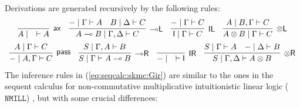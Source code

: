 \documentclass[sn-mathphys-num]{sn-jnl}%
\newcommand{\tl}{\otimes \mathsf{L}}
\newcommand{\tr}{\otimes\mathsf{R}}
\newcommand{\pass}{\mathsf{pass}}
\newcommand{\unitl}{\mathsf{IL}}
\newcommand{\unitr}{\mathsf{IR}}
\newcommand{\ax}{\mathsf{ax}}
\newcommand{\ot}{\otimes}
\newcommand{\lolli}{\multimap}
\newcommand{\lleft}{{\lolli}\mathsf{L}}
\newcommand{\lright}{{\lolli}\mathsf{R}}
\newcommand{\I}{\mathsf{I}}
\newcommand{\vdG}{\vdash}
\newcommand{\NMILL}{$\mathtt{NMILL}$}
\theoremstyle{thmstyleone}%
\theoremstyle{thmstyletwo}%
\theoremstyle{thmstylethree}%
\begin{document}
Derivations are generated recursively by the following rules:
\begin{equation}\label{eq:seqcalc:skmc:Gir}
	  \begin{array}{c}
		\infer[\ax]{A \mid \quad \vdG A}{}
		\quad
		\infer[\lleft]{A \lolli B \mid \Gamma , \Delta \vdG C}{
		  {-} \mid \Gamma \vdG A
		  &
		  B \mid \Delta \vdG C
		}
		\quad
		\infer[\unitl]{\I \mid \Gamma \vdG C}{{-} \mid \Gamma \vdG C}
		\quad
		\infer[\tl]{A \ot B \mid \Gamma \vdG C}{A \mid B , \Gamma \vdG C}
		\\[5pt]
    \infer[\pass]{{-} \mid A , \Gamma \vdG C}{A \mid \Gamma \vdG C}
		\quad
		\infer[\lright]{S \mid \Gamma \vdG A \lolli B}{S \mid \Gamma , A \vdG B}
		\quad
		\infer[\unitr]{{-} \mid \quad \vdG \I}{}
		\quad
		\infer[\tr]{S \mid \Gamma , \Delta \vdG A \ot B}{
		  S \mid \Gamma \vdG A
		  &
		  {-} \mid \Delta \vdG B
		}
	  \end{array}
	\end{equation}
The inference rules in (\ref{eq:seqcalc:skmc:Gir}) are similar to the ones in the sequent calculus for non-commutative multiplicative intuitionistic linear logic (\NMILL) \cite{abrusci:noncommutative:1990}, but with some crucial differences: 
\end{document}
